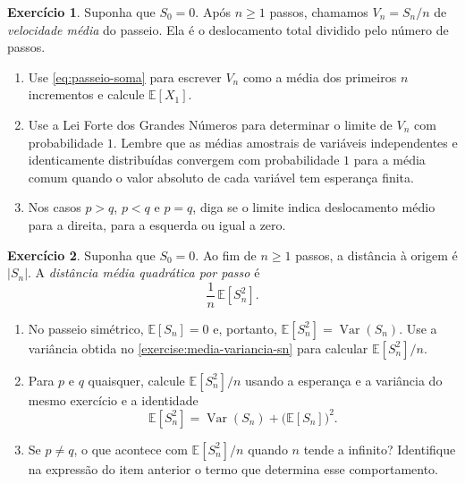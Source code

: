\documentclass[12pt,portuguese]{article}
\theoremstyle{definition}
\theoremstyle{plainexercise}
\newtheorem{exercise}{Exercício}
\theoremstyle{starredexercise}
\theoremstyle{definition}
\begin{document}
\begin{exercise}\label{exercise:velocidade-media}
Suponha que $S_0 = 0$. Após $n \geqslant 1$ passos, chamamos
$V_n = S_n/n$ de \emph{velocidade média} do passeio. Ela é o deslocamento
total dividido pelo número de passos.
\begin{enumerate}[label=(\alph*)]
  \item Use \eqref{eq:passeio-soma} para escrever $V_n$ como a média dos
  primeiros $n$ incrementos e calcule $\mathbb{E}[X_1]$.
  \item Use a Lei Forte dos Grandes Números para determinar o limite de
  $V_n$ com probabilidade $1$. Lembre que as médias amostrais de variáveis
  independentes e identicamente distribuídas convergem com probabilidade
  $1$ para a média comum quando o valor absoluto de cada variável tem
  esperança finita.
  \item Nos casos $p > q$, $p < q$ e $p = q$, diga se o limite indica
  deslocamento médio para a direita, para a esquerda ou igual a zero.
\end{enumerate}
\end{exercise}

\begin{exercise}\label{exercise:distancia-media-quadratica}
Suponha que $S_0 = 0$. Ao fim de $n \geqslant 1$ passos, a distância à
origem é $|S_n|$. A \emph{distância média quadrática por passo} é
\[
  \frac{1}{n}\,\mathbb{E}[S_n^2].
\]
\begin{enumerate}[label=(\alph*)]
  \item No passeio simétrico, $\mathbb{E}[S_n] = 0$ e, portanto,
  $\mathbb{E}[S_n^2] = \operatorname{Var}(S_n)$. Use a variância obtida no
  \cref{exercise:media-variancia-sn} para calcular $\mathbb{E}[S_n^2]/n$.
  \item Para $p$ e $q$ quaisquer, calcule $\mathbb{E}[S_n^2]/n$ usando a
  esperança e a variância do mesmo exercício e a identidade
  \[
    \mathbb{E}[S_n^2] = \operatorname{Var}(S_n) + \bigl(\mathbb{E}[S_n]\bigr)^2.
  \]
  \item Se $p \neq q$, o que acontece com $\mathbb{E}[S_n^2]/n$ quando
  $n$ tende a infinito? Identifique na expressão do item anterior o termo
  que determina esse comportamento.
\end{enumerate}
\end{exercise}
\end{document}
